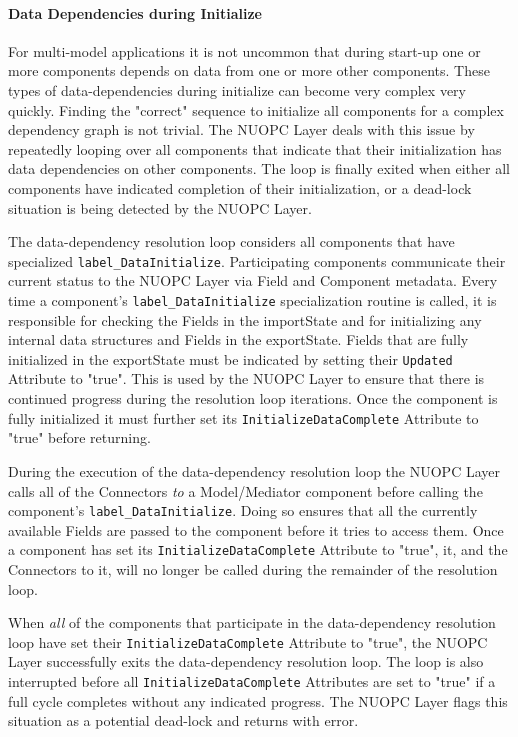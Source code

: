 \paragraph{Data Dependencies during Initialize}

\label{DataDepInit}

For multi-model applications it is not uncommon that during start-up one or more components depends on data from one or more other components. These types of data-dependencies during initialize can become very complex very quickly. Finding the "correct" sequence to initialize all components for a complex dependency graph is not trivial. The NUOPC Layer deals with this issue by repeatedly looping over all components that indicate that their initialization has data dependencies on other components. The loop is finally exited when either all components have indicated completion of their initialization, or a dead-lock situation is being detected by the NUOPC Layer.

The data-dependency resolution loop considers all components that have specialized {\tt label\_DataInitialize}. Participating components communicate their current status to the NUOPC Layer via Field and Component metadata. Every time a component's {\tt label\_DataInitialize} specialization routine is called, it is responsible for checking the Fields in the importState and for initializing any internal data structures and Fields in the exportState. Fields that are fully initialized in the exportState must be indicated by setting their {\tt Updated} Attribute to "true". This is used by the NUOPC Layer to ensure that there is continued progress during the resolution loop iterations. Once the component is fully initialized it must further set its {\tt InitializeDataComplete} Attribute to "true" before returning.

During the execution of the data-dependency resolution loop the NUOPC Layer calls all of the Connectors {\em to} a Model/Mediator component before calling the component's {\tt label\_DataInitialize}. Doing so ensures that all the currently available Fields are passed to the component before it tries to access them. Once a component has set its {\tt InitializeDataComplete} Attribute to "true", it, and the Connectors to it, will no longer be called during the remainder of the resolution loop. 

When {\em all} of the components that participate in the data-dependency resolution loop have set their {\tt InitializeDataComplete} Attribute to "true", the NUOPC Layer successfully exits the data-dependency resolution loop. The loop is also interrupted before all {\tt InitializeDataComplete} Attributes are set to "true" if a full cycle completes without any indicated progress. The NUOPC Layer flags this situation as a potential dead-lock and returns with error.
